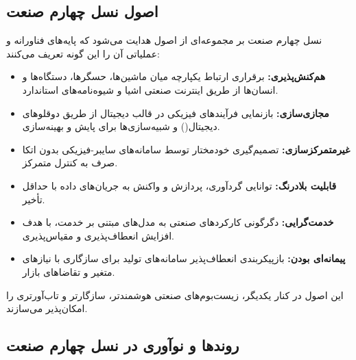 \subsection{اصول نسل چهارم صنعت}

نسل چهارم صنعت بر مجموعه‌ای از اصول هدایت می‌شود که پایه‌های فناورانه و عملیاتی آن را این گونه تعریف می‌کنند:

\begin{itemize}
\item
\textbf{هم‌کنش‌پذیری:} برقراری ارتباط یکپارچه میان ماشین‌ها، حسگرها، دستگاه‌ها و انسان‌ها از طریق اینترنت صنعتی اشیا و شیوه‌نامه‌های استاندارد.

\item
\textbf{مجازی‌سازی:} بازنمایی فرآیندهای فیزیکی در قالب دیجیتال از طریق دوقلوهای دیجیتال() و شبیه‌سازی‌ها برای پایش و بهینه‌سازی.

\item
\textbf{غیرمتمرکزسازی:} تصمیم‌گیری خودمختار توسط سامانه‌های سایبر-فیزیکی بدون اتکا صرف به کنترل متمرکز.

\item
\textbf{قابلیت بلادرنگ:} توانایی گردآوری، پردازش و واکنش به جریان‌های داده با حداقل تأخیر.

\item
\textbf{خدمت‌گرایی:} دگرگونی کارکردهای صنعتی به مدل‌های مبتنی بر خدمت، با هدف افزایش انعطاف‌پذیری و مقیاس‌پذیری.

\item
\textbf{پیمانه‌ای بودن:} بازپیکربندی انعطاف‌پذیر سامانه‌های تولید برای سازگاری با نیازهای متغیر و تقاضاهای بازار.
\end{itemize}

این اصول در کنار یکدیگر، زیست‌بوم‌های صنعتی هوشمندتر، سازگارتر و تاب‌آورتری را امکان‌پذیر می‌سازند.

\subsection{روندها و نوآوری در نسل چهارم صنعت}

